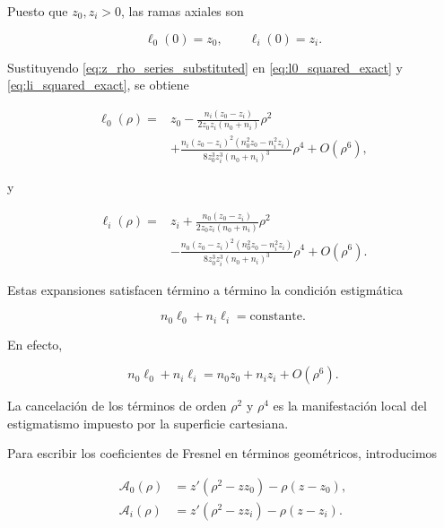 Puesto que \(z_0,z_i>0\), las ramas axiales son

\begin{equation}
\ell_0(0)=z_0,
\qquad
\ell_i(0)=z_i.
\label{eq:l0_li_axis_branches}
\end{equation}

Sustituyendo \eqref{eq:z_rho_series_substituted} en \eqref{eq:l0_squared_exact} y \eqref{eq:li_squared_exact}, se obtiene

\begin{align}
\ell_0(\rho)
=
{}&
z_0
-
\frac{
n_i(z_0-z_i)
}{
2z_0z_i(n_0+n_i)
}
\rho^2
\nonumber
\\[4pt]
&
+
\frac{
n_i(z_0-z_i)^2
(n_0^2z_0-n_i^2z_i)
}{
8z_0^3z_i^3(n_0+n_i)^3
}
\rho^4
+
O(\rho^6),
\label{eq:l0_series_expansion}
\end{align}

y

\begin{align}
\ell_i(\rho)
=
{}&
z_i
+
\frac{
n_0(z_0-z_i)
}{
2z_0z_i(n_0+n_i)
}
\rho^2
\nonumber
\\[4pt]
&
-
\frac{
n_0(z_0-z_i)^2
(n_0^2z_0-n_i^2z_i)
}{
8z_0^3z_i^3(n_0+n_i)^3
}
\rho^4
+
O(\rho^6).
\label{eq:li_series_expansion}
\end{align}

Estas expansiones satisfacen término a término la condición estigmática

\begin{equation}
n_0\ell_0+n_i\ell_i
=
\text{constante}.
\label{eq:cartesian_optical_path_condition}
\end{equation}

En efecto,

\begin{equation}
n_0\ell_0+n_i\ell_i
=
n_0z_0+n_iz_i
+
O(\rho^6).
\label{eq:optical_path_constant_local}
\end{equation}

La cancelación de los términos de orden \(\rho^2\) y \(\rho^4\) es la manifestación local del estigmatismo impuesto por la superficie cartesiana.

Para escribir los coeficientes de Fresnel en términos geométricos, introducimos

\begin{align}
\mathcal A_0(\rho)
&=
z'\left(\rho^2-zz_0\right)
-
\rho\left(z-z_0\right),
\label{eq:A0_geometrical_factor}
\\[6pt]
\mathcal A_i(\rho)
&=
z'\left(\rho^2-zz_i\right)
-
\rho\left(z-z_i\right).
\label{eq:Ai_geometrical_factor}
\end{align}


